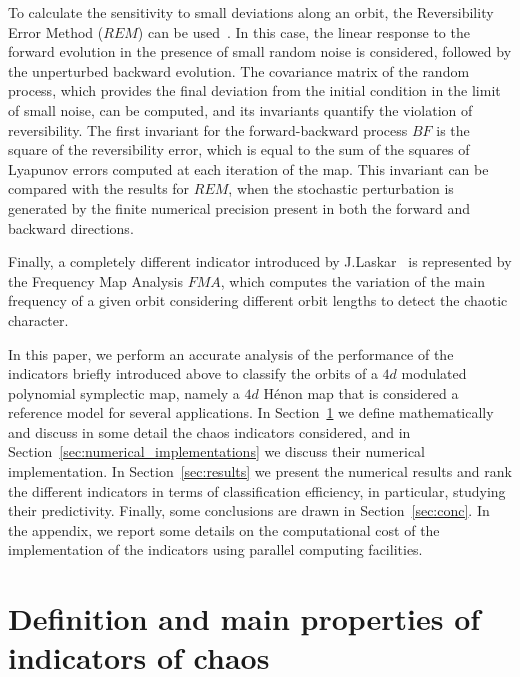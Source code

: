 To calculate the sensitivity to small deviations along an orbit, the Reversibility Error Method ($REM$) can be used~\cite{Panichi2016,Panichi2017}. In this case, the linear response to the forward evolution in the presence of small random noise is considered, followed by the unperturbed backward evolution. The covariance matrix of the random process, which provides the final deviation from the initial condition in the limit of small noise, can be computed, and its invariants quantify the violation of reversibility. The first invariant for the forward-backward process $BF$ is the square of the reversibility error, which is equal to the sum of the squares of Lyapunov errors computed at each iteration of the map. This invariant can be compared with the results for $REM$, when the stochastic perturbation is generated by the finite numerical precision present in both the forward and backward directions. 

Finally, a completely different indicator introduced by J.Laskar~\cite{Laskar1999,Laskar2003} is represented by the Frequency Map Analysis $FMA$, which computes the variation of the main frequency of a given orbit considering different orbit lengths to detect the chaotic character. 

In this paper, we perform an accurate analysis of the performance of the indicators briefly introduced above to classify the orbits of a $4d$ modulated polynomial symplectic map, namely a $4d$ H\'enon map that is considered a reference model for several applications. In Section~\ref{sec:review} we define mathematically and discuss in some detail the chaos indicators considered, and in Section~\ref{sec:numerical_implementations} we discuss their numerical implementation. In Section~\ref{sec:results} we present the numerical results and rank the different indicators in terms of classification efficiency, in particular, studying their predictivity. Finally, some conclusions are drawn in Section~\ref{sec:conc}. In the appendix, we report some details on the computational cost of the implementation of the indicators using parallel computing facilities. 
%
\section{Definition and main properties of indicators of chaos} \label{sec:review}
%
